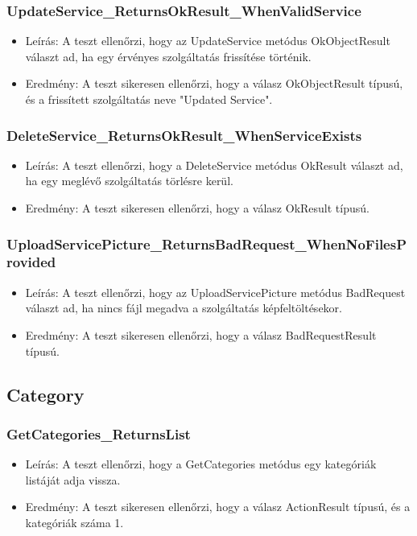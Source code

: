 \documentclass[11pt]{article}
\begin{document}
\subsubsection{UpdateService\_ReturnsOkResult\_WhenValidService}
\label{sec:org7a9a37c}
\begin{itemize}
\item Leírás: A teszt ellenőrzi, hogy az UpdateService metódus OkObjectResult választ ad, ha egy érvényes szolgáltatás frissítése történik.
\item Eredmény: A teszt sikeresen ellenőrzi, hogy a válasz OkObjectResult típusú, és a frissített szolgáltatás neve "Updated Service".
\end{itemize}
\subsubsection{DeleteService\_ReturnsOkResult\_WhenServiceExists}
\label{sec:orgceadc58}
\begin{itemize}
\item Leírás: A teszt ellenőrzi, hogy a DeleteService metódus OkResult választ ad, ha egy meglévő szolgáltatás törlésre kerül.
\item Eredmény: A teszt sikeresen ellenőrzi, hogy a válasz OkResult típusú.
\end{itemize}
\subsubsection{UploadServicePicture\_ReturnsBadRequest\_WhenNoFilesProvided}
\label{sec:org1ad273c}
\begin{itemize}
\item Leírás: A teszt ellenőrzi, hogy az UploadServicePicture metódus BadRequest választ ad, ha nincs fájl megadva a szolgáltatás képfeltöltésekor.
\item Eredmény: A teszt sikeresen ellenőrzi, hogy a válasz BadRequestResult típusú.
\end{itemize}
\subsection{Category}
\label{sec:org196e7e4}
\subsubsection{GetCategories\_ReturnsList}
\label{sec:org0b1c2bc}
\begin{itemize}
\item Leírás: A teszt ellenőrzi, hogy a GetCategories metódus egy kategóriák listáját adja vissza.
\item Eredmény: A teszt sikeresen ellenőrzi, hogy a válasz ActionResult típusú, és a kategóriák száma 1.
\end{itemize}
\end{document}
